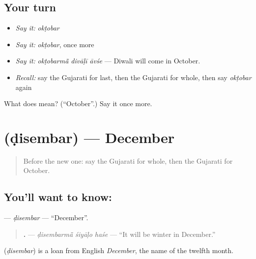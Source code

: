 \subsection*{Your turn}
\begin{itemize}
\raggedright
  \item \emph{Say it:} \emph{okṭobar}
  \item \emph{Say it:} \emph{okṭobar}, once more
  \item \emph{Say it:} \emph{okṭobarmā̃ divāḷī āvśe} — Diwali will come in October.
  \item \emph{Recall:} say the Gujarati for last, then the Gujarati for whole, then say \emph{okṭobar} again
\end{itemize}

\begin{tcolorbox}[breakable,colback=teal!4,colframe=teal!35!black,title={Before you move on}]
What does  mean? (\textquotedblleft{}October\textquotedblright{}.) Say it once more.
\end{tcolorbox}
\section[\texorpdfstring{\gu{ડિસેમ્બર} (ḍisembar)}{ડિસેમ્બર (ḍisembar)}]{ (ḍisembar) — December}

\label{lesson:GU-C174-disembar}



\begin{quote}
Before the new one: say the Gujarati for whole, then the Gujarati for October.
\end{quote}

\subsection*{You'll want to know: }
\textbf{} — \emph{ḍisembar} — \textquotedblleft{}December\textquotedblright{}.

\begin{quote}
\textbf{  .} — \emph{ḍisembarmā̃ śiyāḷo haśe} — \textquotedblleft{}It will be winter in December.\textquotedblright{}
\end{quote}

\begin{cousinweb}
\textbf{} (\emph{ḍisembar}) is a loan from English \emph{December}, the name of the twelfth month.
\end{cousinweb}

